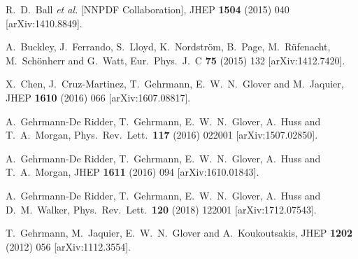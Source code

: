 \documentclass[12pt]{article}
\def\to{\rightarrow}
\begin{document}
\begin{thebibliography}{99}
  
   R.~D.~Ball {\it et al.} [NNPDF Collaboration],
  JHEP {\bf 1504} (2015) 040
  [arXiv:1410.8849].

  A.~Buckley, J.~Ferrando, S.~Lloyd, K.~Nordstr\"om, B.~Page, M.~R\"ufenacht, M.~Sch\"onherr and G.~Watt,
  Eur.\ Phys.\ J.\ C {\bf 75} (2015) 132
  [arXiv:1412.7420].

  X.~Chen, J.~Cruz-Martinez, T.~Gehrmann, E.~W.~N.~Glover and M.~Jaquier,
  JHEP {\bf 1610} (2016) 066
  [arXiv:1607.08817].

  A.~Gehrmann-De Ridder, T.~Gehrmann, E.~W.~N.~Glover, A.~Huss and T.~A.~Morgan,
  Phys.\ Rev.\ Lett.\  {\bf 117} (2016)   022001
  [arXiv:1507.02850].

  A.~Gehrmann-De Ridder, T.~Gehrmann, E.~W.~N.~Glover, A.~Huss and T.~A.~Morgan,
  JHEP {\bf 1611} (2016) 094
  [arXiv:1610.01843].
  
  A.~Gehrmann-De Ridder, T.~Gehrmann, E.~W.~N.~Glover, A.~Huss and D.~M.~Walker,
  Phys.\ Rev.\ Lett.\  {\bf 120} (2018)  122001
  [arXiv:1712.07543].

  T.~Gehrmann, M.~Jaquier, E.~W.~N.~Glover and A.~Koukoutsakis,
  JHEP {\bf 1202} (2012) 056
   [arXiv:1112.3554].


\end{thebibliography}
\end{document}
